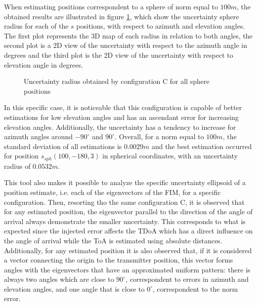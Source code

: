 When estimating positions correspondent to a sphere of norm equal to $100m$, the obtained results are illustrated in figure \ref{fig:fim-100-C}, which show the uncertainty sphere radius for each of the $s$ positions, with respect to azimuth and elevation angles. The first plot represents the 3D map of each radius in relation to both angles, the second plot is a 2D view of the uncertainty with respect to the azimuth angle in degrees and the third plot is the 2D view of the uncertainty with respect to elevation angle in degrees.

\begin{figure}[!htb]
	\captionsetup{justification=centering,margin=2cm}
	\caption{Uncertainty radius obtained by configuration C for all sphere positions}
	\label{fig:fim-100-C}
\end{figure}

In this specific case, it is noticeable that this configuration is capable of better estimations for low elevation angles and has an ascendant error for increasing elevation angles. Additionally, the uncertainty has a tendency to increase for azimuth angles around $-90^{\circ}$ and $90^{\circ}$. Overall, for a norm equal to $100 m$, the standard deviation of all estimations is $0.0029m$ and the best estimation occurred for position $s_{sph}(100,-180,3)$ in spherical coordinates, with an uncertainty radius of $0.0532m$.

This tool also makes it possible to analyze the specific uncertainty ellipsoid of a position estimate, i.e. each of the eigenvectors of the FIM, for a specific configuration. Then, resorting tho the same configuration C, it is observed that for any estimated position, the eigenvector parallel to the direction of the angle of arrival always demonstrate the smaller uncertainty. This corresponds to what is expected since the injected error affects the TDoA which has a direct influence on the angle of arrival while the ToA is estimated using absolute distances. Additionally, for any estimated position it is also observed that, if it is considered a vector connecting the origin to the transmitter position, this vector forms angles with the eigenvectors that have an approximated uniform pattern: there is always two angles which are close to $90^{\circ}$, correspondent to errors in azimuth and elevation angles, and one angle that is close to $0^{\circ}$, correspondent to the norm error. 

